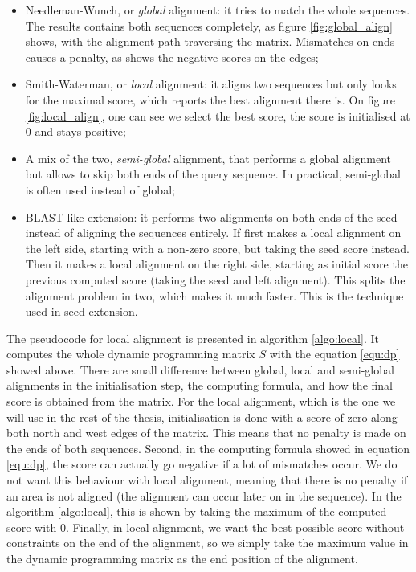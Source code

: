 \begin{itemize}
	\item Needleman-Wunch, or \emph{global} alignment: it tries to match the whole sequences. The results contains both sequences completely, as figure \ref{fig:global_align} shows, with the alignment path traversing the matrix. Mismatches on ends causes a penalty, as shows the negative scores on the edges;
	\item Smith-Waterman, or \emph{local} alignment: it aligns two sequences but only looks for the maximal score, which reports the best alignment there is. On figure \ref{fig:local_align}, one can see we select the best score, the score is initialised at 0 and stays positive;
	\item A mix of the two, \emph{semi-global} alignment, that performs a global alignment but allows to skip both ends of the query sequence. In practical, semi-global is often used instead of global;
	\item BLAST-like extension: it performs two alignments on both ends of the seed instead of aligning the sequences entirely. If first makes a local alignment on the left side, starting with a non-zero score, but taking the seed score instead. Then it makes a local alignment on the right side, starting as initial score the previous computed score (taking the seed and left alignment). This splits the alignment problem in two, which makes it much faster. This is the technique used in seed-extension.
\end{itemize}

The pseudocode for local alignment is presented in algorithm \ref{algo:local}. It computes the whole dynamic programming matrix $S$ with the equation \ref{equ:dp} showed above. There are small difference between global, local and semi-global alignments in the initialisation step, the computing formula, and how the final score is obtained from the matrix. For the local alignment, which is the one we will use in the rest of the thesis, initialisation is done with a score of zero along both north and west edges of the matrix. This means that no penalty is made on the ends of both sequences. Second, in the computing formula showed in equation \ref{equ:dp}, the score can actually go negative if a lot of mismatches occur. We do not want this behaviour with local alignment, meaning that there is no penalty if an area is not aligned (the alignment can occur later on in the sequence). In the algorithm \ref{algo:local}, this is shown by taking the maximum of the computed score with 0. Finally, in local alignment, we want the best possible score without constraints on the end of the alignment, so we simply take the maximum value in the dynamic programming matrix as the end position of the alignment.

